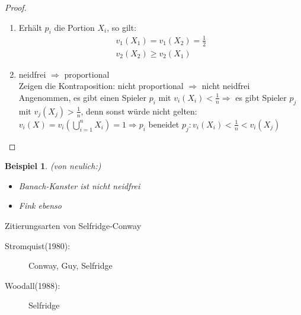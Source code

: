 \documentclass[a4paper,10pt]{scrartcl}
\newtheorem*{beispiel*}{Beispiel}
\begin{document}
\begin{proof}
 \begin{enumerate}
  \item Erhält $p_i$ die Portion $X_i$, so gilt:
   \begin{align*}
    v_1(X_1)=v_1(X_2)=\frac{1}{2}\\
    v_2(X_2)\geq v_2(X_1)
   \end{align*}
  \item neidfrei $\Rightarrow$ proportional\\
   Zeigen die Kontraposition: nicht proportional $\Rightarrow$ nicht neidfrei\\
   Angenommen, es gibt einen Spieler $p_i$ mit $v_i(X_i)<\frac{1}{n} \Rightarrow$ es gibt Spieler $p_j$ mit $v_j(X_j)>\frac{1}{n}$,
   denn sonst würde nicht gelten: $v_i(X)=v_i\left(\bigcup\limits_{i=1}^nX_i\right)=1 \Rightarrow p_i$ beneidet $p_j: v_i(X_i)<\frac{1}{n}
   <v_i(X_j)$
 \end{enumerate}
\end{proof}
\begin{beispiel*}(von neulich:) \begin{itemize}
                       \item[] Banach-Kanster ist nicht neidfrei
                       \item[] Fink ebenso
                      \end{itemize}
\end{beispiel*}
Zitierungsarten von Selfridge-Conway \begin{description}
                                      \item[Stromquist(1980):] Conway, Guy, Selfridge 
                                      \item[Woodall(1988):] Selfridge
                                     \end{description}


\end{document}
